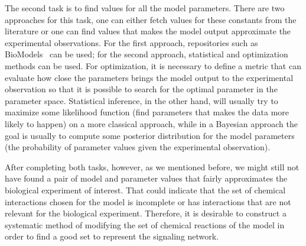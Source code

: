 The second task is to find values for all the model parameters. There 
are two approaches for this task, one can either fetch values for these 
constants from the literature or one can find values that makes the 
model output approximate the experimental observations. For the first 
approach, repositories such as BioModels~\cite{le2006biomodels} can be 
used; for the second approach, statistical and optimization methods can 
be used. For optimization, it is necessary to define a metric that can 
evaluate how close the parameters brings the model output to the 
experimental observation so that it is possible to search for the 
optimal parameter in the parameter space. Statistical inference, in the 
other hand, will usually try to maximize some likelihood function (find
parameters that makes the data more likely to happen) on a more 
classical approach, while in a Bayesian approach the goal is usually to
compute some posterior distribution for the model parameters (the 
probability of parameter values given the experimental observation).


After completing both tasks, however, as we mentioned before, we might 
still not have found a pair of model and parameter values that fairly 
approximates the biological experiment of interest. That could indicate 
that the set of chemical interactions chosen for the model is 
incomplete or has interactions that are not relevant for the biological 
experiment. Therefore, it is desirable to construct a systematic method 
of modifying the set of chemical reactions of the model in order to 
find a good set to represent the signaling network.

